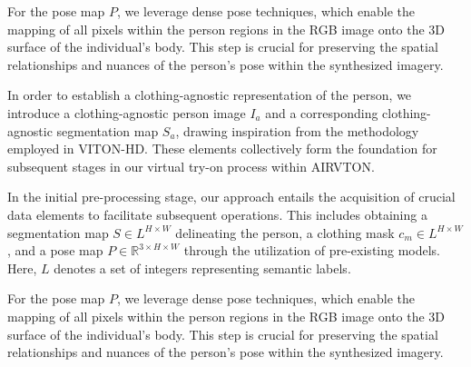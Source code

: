     For the pose map \( P \), we leverage dense pose techniques, which enable the mapping of all pixels within the person regions in the RGB image onto the 3D surface of the individual's body. This step is crucial for preserving the spatial relationships and nuances of the person's pose within the synthesized imagery.

    In order to establish a clothing-agnostic representation of the person, we introduce a clothing-agnostic person image \( I_a \) and a corresponding clothing-agnostic segmentation map \( S_a \), drawing inspiration from the methodology employed in VITON-HD. These elements collectively form the foundation for subsequent stages in our virtual try-on process within AIRVTON.

    In the initial pre-processing stage, our approach entails the acquisition of crucial data elements to facilitate subsequent operations. This includes obtaining a segmentation map \( S \in L^{H \times W} \) delineating the person, a clothing mask \( c_m \in L^{H \times W} \), and a pose map \( P \in \mathbb{R}^{3 \times H \times W} \) through the utilization of pre-existing models. Here, \( L \) denotes a set of integers representing semantic labels.

    For the pose map \( P \), we leverage dense pose techniques, which enable the mapping of all pixels within the person regions in the RGB image onto the 3D surface of the individual's body. This step is crucial for preserving the spatial relationships and nuances of the person's pose within the synthesized imagery.

